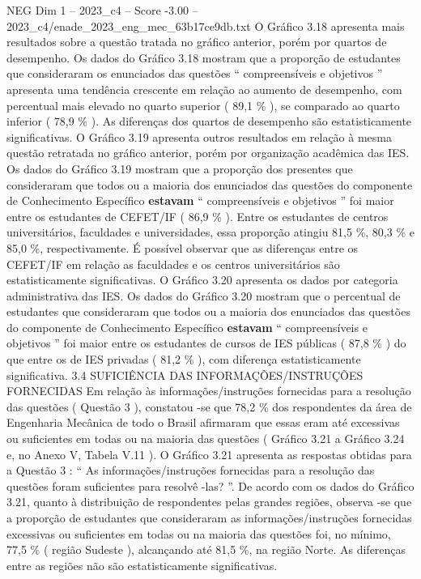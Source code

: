 \begin{textsample}{NEG Dim 1 – 2023\_c4 – Score -3.00 – 2023\_c4/enade\_2023\_eng\_mec\_63b17ce9db.txt}
O Gráfico 3.18 apresenta mais resultados sobre a questão tratada no gráfico anterior, porém por quartos de desempenho.
Os dados do Gráfico 3.18 mostram que a proporção de estudantes que consideraram os enunciados das questões “ compreensíveis e objetivos ” apresenta uma tendência crescente em relação ao aumento de desempenho, com percentual mais elevado no quarto superior ( 89,1 \% ), se comparado ao quarto inferior ( 78,9 \% ).
As diferenças dos quartos de desempenho são estatisticamente significativas.
O Gráfico 3.19 apresenta outros resultados em relação à mesma questão retratada no gráfico anterior, porém por organização acadêmica das IES.
Os dados do Gráfico 3.19 mostram que a proporção dos presentes que consideraram que todos ou a maioria dos enunciados das questões do componente de Conhecimento Específico \textbf{estavam} “ compreensíveis e objetivos ” foi maior entre os estudantes de CEFET/IF ( 86,9 \% ).
Entre os estudantes de centros universitários, faculdades e universidades, essa proporção atingiu 81,5 \%, 80,3 \% e 85,0 \%, respectivamente.
É possível observar que as diferenças entre os CEFET/IF em relação as faculdades e os centros universitários são estatisticamente significativas.
O Gráfico 3.20 apresenta os dados por categoria administrativa das IES.
Os dados do Gráfico 3.20 mostram que o percentual de estudantes que consideraram que todos ou a maioria dos enunciados das questões do componente de Conhecimento Específico \textbf{estavam} “ compreensíveis e objetivos ” foi maior entre os estudantes de cursos de IES públicas ( 87,8 \% ) do que entre os de IES privadas ( 81,2 \% ), com diferença estatisticamente significativa. 3.4 SUFICIÊNCIA DAS INFORMAÇÕES/INSTRUÇÕES FORNECIDAS Em relação às informações/instruções fornecidas para a resolução das questões ( Questão 3 ), constatou -se que 78,2 \% dos respondentes da área de Engenharia Mecânica de todo o Brasil afirmaram que essas eram até excessivas ou suficientes em todas ou na maioria das questões ( Gráfico 3.21 a Gráfico 3.24 e, no Anexo V, Tabela V.11 ).
O Gráfico 3.21 apresenta as respostas obtidas para a Questão 3 : “ As informações/instruções fornecidas para a resolução das questões foram suficientes para resolvê -las? ”.
De acordo com os dados do Gráfico 3.21, quanto à distribuição de respondentes pelas grandes regiões, observa -se que a proporção de estudantes que consideraram as informações/instruções fornecidas excessivas ou suficientes em todas ou na maioria das questões foi, no mínimo, 77,5 \% ( região Sudeste ), alcançando até 81,5 \%, na região Norte.
As diferenças entre as regiões não são estatisticamente significativas.

\end{textsample}
